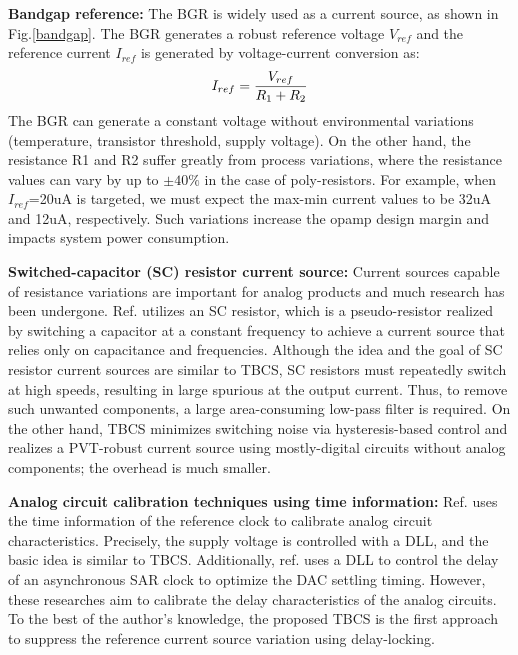 \documentclass[paper]{ieice}
\begin{document}
\qquad \textbf{Bandgap reference:} The BGR is widely used as a current source, as shown in Fig.\ref{bandgap}. The BGR generates a robust reference voltage $V_{ref}$ and the reference current $I_{ref}$ is generated by voltage-current conversion as:
\begin{eqnarray}
    \centering
    I_{ref} = \frac{V_{ref}}{R_1 + R_2}
    \label{sar13b}
\end{eqnarray}
The BGR can generate a constant voltage without environmental variations (temperature, transistor threshold, supply voltage). On the other hand, the resistance R1 and R2 suffer greatly from process variations, where the resistance values can vary by up to $\pm 40\%$ in the case of poly-resistors. For example, when $I_{ref}$=20uA is targeted, we must expect the max-min current values to be 32uA and 12uA, respectively. Such variations increase the opamp design margin and impacts system power consumption.

\textbf{Switched-capacitor (SC) resistor current source:} Current sources capable of resistance variations are important for analog products and much research has been undergone. Ref.\cite{chuanyang,ron} utilizes an SC resistor, which is a pseudo-resistor realized by switching a capacitor at a constant frequency to achieve a current source that relies only on capacitance and frequencies. Although the idea and the goal of SC resistor current sources are similar to TBCS, SC resistors must repeatedly switch at high speeds, resulting in large spurious at the output current. Thus, to remove such unwanted components, a large area-consuming low-pass filter is required. On the other hand, TBCS minimizes switching noise via hysteresis-based control and realizes a PVT-robust current source using mostly-digital circuits without analog components; the overhead is much smaller.

\textbf{Analog circuit calibration techniques using time information:} Ref.\cite{zhu} uses the time information of the reference clock to calibrate analog circuit characteristics. Precisely, the supply voltage is controlled with a DLL, and the basic idea is similar to TBCS. Additionally, ref.\cite{kapusta201314b,tompson} uses a DLL to control the delay of an asynchronous SAR clock to optimize the DAC settling timing.
However, these researches aim to calibrate the delay characteristics of the analog circuits. To the best of the author's knowledge, the proposed TBCS is the first approach to suppress the reference current source variation using delay-locking.
\end{document}
